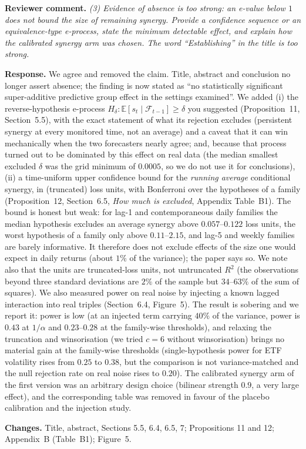 \documentclass[11pt,a4paper]{article}
\newcommand{\rev}[1]{\par\noindent\textbf{Reviewer comment.} \emph{#1}}
\newcommand{\resp}{\par\noindent\textbf{Response.} }
\newcommand{\chg}{\par\noindent\textbf{Changes.} }
\begin{document}
\rev{(3) Evidence of absence is too strong: an e-value below $1$ does not bound the size of remaining synergy. Provide a confidence sequence or an equivalence-type e-process, state the minimum detectable effect, and explain how the calibrated synergy arm was chosen. The word ``Establishing'' in the title is too strong.}
\resp We agree and removed the claim. Title, abstract and conclusion no longer assert absence; the finding is now stated as ``no statistically significant super-additive predictive group effect in the settings examined''. We added (i) the reverse-hypothesis e-process $H_\delta:\mathbb E[s_t\mid\mathcal F_{t-1}]\ge\delta$ you suggested (Proposition~11, Section~5.5), with the exact statement of what its rejection excludes (persistent synergy at every monitored time, not an average) and a caveat that it can win mechanically when the two forecasters nearly agree; and, because that process turned out to be dominated by this effect on real data (the median smallest excluded $\delta$ was the grid minimum of $0.0005$, so we do not use it for conclusions), (ii) a time-uniform upper confidence bound for the \emph{running average} conditional synergy, in (truncated) loss units, with Bonferroni over the hypotheses of a family (Proposition~12, Section~6.5, \emph{How much is excluded}, Appendix Table~B1). The bound is honest but weak: for lag-1 and contemporaneous daily families the median hypothesis excludes an average synergy above $0.057$--$0.122$ loss units, the worst hypothesis of a family only above $0.11$--$2.15$, and lag-5 and weekly families are barely informative. It therefore does not exclude effects of the size one would expect in daily returns (about $1\%$ of the variance); the paper says so. We note also that the units are truncated-loss units, not untruncated $R^2$ (the observations beyond three standard deviations are $2\%$ of the sample but $34$--$63\%$ of the sum of squares). We also measured power on real noise by injecting a known lagged interaction into real triples (Section~6.4, Figure~5). The result is sobering and we report it: power is low (at an injected term carrying $40\%$ of the variance, power is $0.43$ at $1/\alpha$ and $0.23$--$0.28$ at the family-wise thresholds), and relaxing the truncation and winsorisation (we tried $c=6$ without winsorisation) brings no material gain at the family-wise thresholds (single-hypothesis power for ETF volatility rises from $0.25$ to $0.38$, but the comparison is not variance-matched and the null rejection rate on real noise rises to $0.20$). The calibrated synergy arm of the first version was an arbitrary design choice (bilinear strength $0.9$, a very large effect), and the corresponding table was removed in favour of the placebo calibration and the injection study.
\chg Title, abstract, Sections 5.5, 6.4, 6.5, 7; Propositions 11 and 12; Appendix~B (Table~B1); Figure~5.
\end{document}

